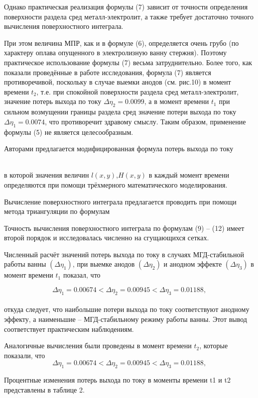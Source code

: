 \documentclass{article}
\begin{document}
Однако практическая реализация формулы (7) зависит от точности определения поверхности раздела сред металл-электролит, а также требует достаточно точного вычисления поверхностного интеграла. 

При этом величина МПР, как и в формуле (6), определяется очень грубо (по характеру оплава опущенного в электролизную ванну стержня). Поэтому практическое использование формулы (7) весьма затруднительно. Более того, как показали проведённые в работе исследования, формула (7) является противоречивой, поскольку в случае выемки анодов (см. рис.10) в момент времени $t_2$, т.е. при спокойной поверхности раздела сред металл-электролит, значение  потерь выхода по току $\Delta\eta_2 = 0.0099$, а в момент времени $t_1$ при сильном возмущении границы раздела сред значение потери выхода по току $\Delta\eta_1 = 0.0074$, что противоречит здравому смыслу.  Таким образом, применение формулы (5) не является целесообразным.

Авторами предлагается модифицированная формула потерь выхода по току 

%
\\
в которой значения величин $l(x,y)$,$ H(x,y)$ в каждый момент времени определяются при помощи трёхмерного математического моделирования.

Вычисление поверхностного интеграла предлагается проводить при помощи метода триангуляции по формулам 

%

Точность вычисления поверхностного интеграла по формулам (9) – (12) имеет второй порядок и исследовалась численно на сгущающихся сетках.

Численный расчёт значений потерь выхода по току в случаях МГД-стабильной работы ванны $(\Delta\eta_1)$, при выемке анодов $(\Delta\eta_2)$ и анодном эффекте $(\Delta\eta_3)$ в момент времени $t_1$ показал, что 

\[ \Delta\eta_1 = 0.00674 < \Delta\eta_2 = 0.00945 < \Delta\eta_3 = 0.01188, \]
\\
откуда следует, что наибольшие потери выхода по току соответствуют анодному эффекту, а наименьшие – МГД-стабильному режиму работы ванны. Этот вывод соответствует практическим наблюдениям.

Аналогичные вычисления были проведены в момент времени $t_2$, которые показали, что
\[ \Delta\eta_1 = 0.00674 < \Delta\eta_2 = 0.00945 < \Delta\eta_3 = 0.01188, \]

Процентные изменения потерь выхода по току в моменты времени t1 и t2 представлены в таблице 2. 
\end{document}
